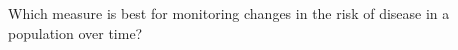 Which measure is best for monitoring changes in the risk of disease in a
population over time?
\begin{MultipleChoice}[itemname=II-7]
\end{MultipleChoice}
